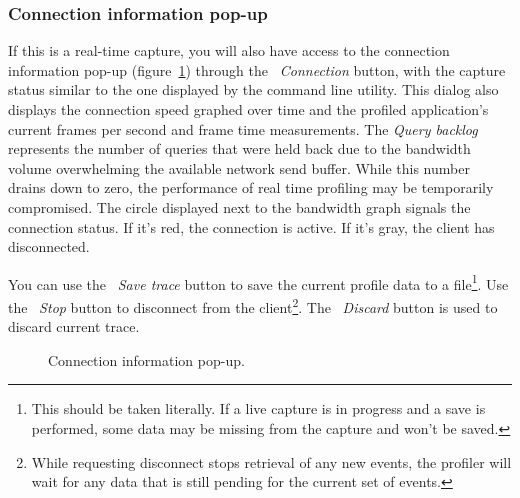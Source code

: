 \documentclass[hidelinks,titlepage,a4paper]{article}
\begin{document}
\subsubsection{Connection information pop-up}
\label{connectionpopup}

If this is a real-time capture, you will also have access to the connection information pop-up (figure~\ref{connectioninfo}) through the \emph{\faWifi{}~Connection} button, with the capture status similar to the one displayed by the command line utility. This dialog also displays the connection speed graphed over time and the profiled application's current frames per second and frame time measurements. The \emph{Query backlog} represents the number of queries that were held back due to the bandwidth volume overwhelming the available network send buffer. While this number drains down to zero, the performance of real time profiling may be temporarily compromised. The circle displayed next to the bandwidth graph signals the connection status. If it's red, the connection is active. If it's gray, the client has disconnected.

You can use the \faSave{}~\emph{Save trace} button to save the current profile data to a file\footnote{This should be taken literally. If a live capture is in progress and a save is performed, some data may be missing from the capture and won't be saved.}. Use the \faPlug{}~\emph{Stop} button to disconnect from the client\footnote{While requesting disconnect stops retrieval of any new events, the profiler will wait for any data that is still pending for the current set of events.}. The \faExclamationTriangle{}~\emph{Discard} button is used to discard current trace.

\begin{figure}[h]
\centering{}
\caption{Connection information pop-up.}
\label{connectioninfo}
\end{figure}
\end{document}
